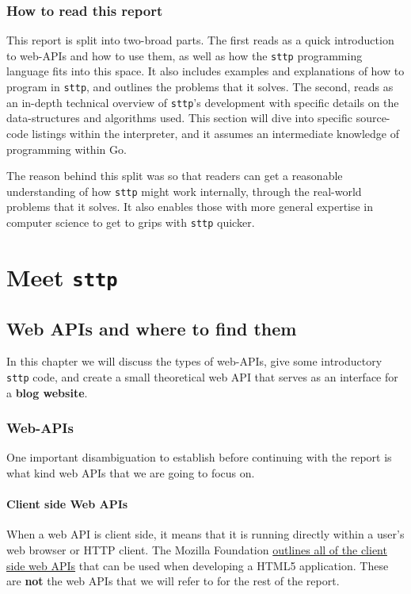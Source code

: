 \documentclass[]{full}
\theoremstyle{definition}
\begin{document}
\section{How to read this report}

This report is split into two-broad parts. The first reads as a quick introduction to web-APIs and how to use them, as well as how the \verb|sttp| programming language fits into this space. It also includes examples and explanations of how to program in \verb|sttp|, and outlines the problems that it solves. The second, reads as an in-depth technical overview of \verb|sttp|'s development with specific details on the data-structures and algorithms used. This section will dive into specific source-code listings within the interpreter, and it assumes an intermediate knowledge of programming within Go.

The reason behind this split was so that readers can get a reasonable understanding of how \verb|sttp| might work internally, through the real-world problems that it solves. It also enables those with more general expertise in computer science to get to grips with \verb|sttp| quicker.

\cprotect\part{Meet \verb|sttp|}

\chapter{Web APIs and where to find them}

In this chapter we will discuss the types of web-APIs, give some introductory \verb|sttp| code, and create a small theoretical web API that serves as an interface for a \textbf{blog website}.

\section{Web-APIs}

One important disambiguation to establish before continuing with the report is what kind web APIs that we are going to focus on.

\subsection{Client side Web APIs}

When a web API is client side, it means that it is running directly within a user's web browser or HTTP client. The Mozilla Foundation \href{https://developer.mozilla.org/en-US/docs/Web/API}{outlines all of the client side web APIs} that can be used when developing a HTML5 application. These are \textbf{not} the web APIs that we will refer to for the rest of the report.
\end{document}
